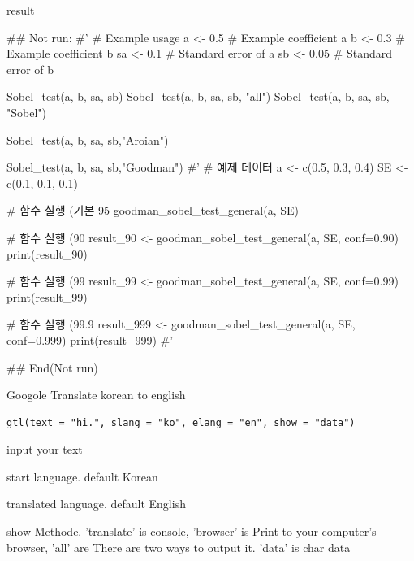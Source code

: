 \documentclass[a4paper]{book}
\begin{document}
%
\begin{Value}
result
\end{Value}
%
\begin{Examples}
\begin{ExampleCode}

\#\# Not run: 
#'
# Example usage
a <- 0.5  # Example coefficient a
b <- 0.3  # Example coefficient b
sa <- 0.1 # Standard error of a
sb <- 0.05 # Standard error of b

Sobel_test(a, b, sa, sb)
Sobel_test(a, b, sa, sb, "all")
Sobel_test(a, b, sa, sb, "Sobel")

Sobel_test(a, b, sa, sb,"Aroian")

Sobel_test(a, b, sa, sb,"Goodman")
#'
# 예제 데이터
a <- c(0.5, 0.3, 0.4)
SE <- c(0.1, 0.1, 0.1)

# 함수 실행 (기본 95%
goodman_sobel_test_general(a, SE)

# 함수 실행 (90%
result_90 <- goodman_sobel_test_general(a, SE, conf=0.90)
print(result_90)

# 함수 실행 (99%
result_99 <- goodman_sobel_test_general(a, SE, conf=0.99)
print(result_99)

# 함수 실행 (99.9%
result_999 <- goodman_sobel_test_general(a, SE, conf=0.999)
print(result_999)
#'


## End(Not run)
\end{ExampleCode}
\end{Examples}
%
\begin{Description}
Googole Translate korean to english
\end{Description}
%
\begin{Usage}
\begin{verbatim}
gtl(text = "hi.", slang = "ko", elang = "en", show = "data")
\end{verbatim}
\end{Usage}
%
\begin{Arguments}
\begin{ldescription}
\item[\code{text}] input your text

\item[\code{slang}] start language. default Korean

\item[\code{elang}] translated language. default English

\item[\code{show}] show Methode. 'translate' is console, 'browser'  is Print to your computer's browser, 'all' are There are two ways to output it. 'data' is char data
\end{ldescription}
\end{Arguments}
\end{document}
